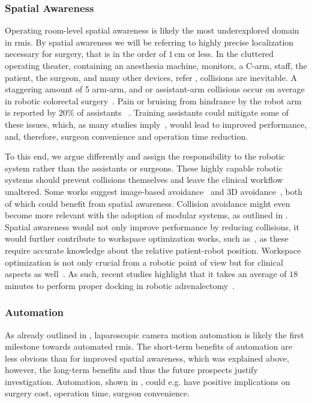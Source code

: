 \subsubsection{Spatial Awareness}
\label{in:sec:spatial_awareness}
Operating room-level spatial awareness is likely the most underexplored domain in \gls{rmis}. By spatial awareness we will be referring to highly precise localization necessary for surgery, that is in the order of $1\,\text{cm}$ or less. In the cluttered operating theater, containing an anesthesia machine, monitors, a C-arm, staff, the patient, the surgeon, and many other devices, refer , collisions are inevitable. A staggering amount of 5 arm-arm, and or assistant-arm collisions occur on average in robotic colorectal surgery~\cite{wong2023improving}. Pain or bruising from hindrance by the robot arm is reported by $20\%$ of assistants ~\cite{van2019ergonomic}. Training assistants could mitigate some of these issues, which, as many studies imply~\cite{cimen2019does, mitsinikos2017does, kwon2020impact}, would lead to improved performance, and, therefore, surgeon convenience and operation time reduction. 

To this end, we argue differently and assign the responsibility to the robotic system rather than the assistants or surgeons. These highly capable robotic systems should prevent collisions themselves and leave the clinical workflow unaltered. Some works suggest image-based avoidance~\cite{hameed2016towards} and 3D avoidance~\cite{li2023three}, both of which could benefit from spatial awareness. Collision avoidance might even become more relevant with the adoption of modular systems, as outlined in . Spatial awareness would not only improve performance by reducing collisions, it would further contribute to workspace optimization works, such as~\cite{hutzl2015knowledge, zelechowski2023automatic}, as these require accurate knowledge about the relative patient-robot position. Workspace optimization is not only crucial from a robotic point of view but for clinical aspects as well~\cite{alhusseinawi2023validation}. As such, recent studies highlight that it takes an average of $18$ minutes to perform proper docking in robotic adrenalectomy~\cite{feng2020robot}.

\subsubsection{Automation}
\label{in:sec:automation}
As already outlined in , laparoscopic camera motion automation is likely the first milestone towards automated \gls{rmis}. The short-term benefits of automation are less obvious than for improved spatial awareness, which was explained above, however, the long-term benefits and thus the future prospects justify investigation. Automation, shown in , could e.g. have positive implications on surgery cost, operation time, surgeon convenience.

